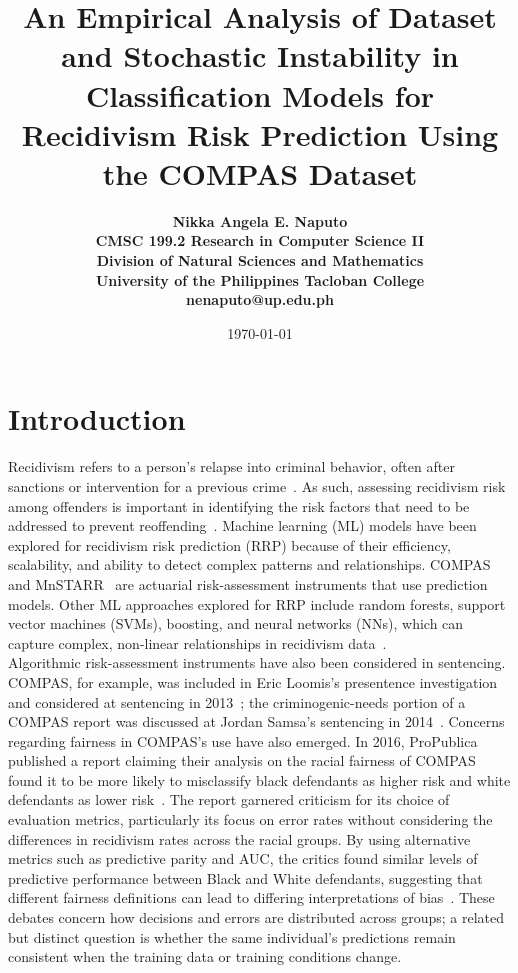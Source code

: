 \documentclass[12pt]{article}
\title{\bfseries An Empirical Analysis of Dataset and Stochastic Instability in Classification Models for Recidivism Risk Prediction Using the COMPAS Dataset}
\author{\bfseries 
 Nikka Angela E. Naputo\\
 CMSC 199.2 Research in Computer Science II\\
 Division of Natural Sciences and Mathematics\\
 University of the Philippines Tacloban College\\
 {\small nenaputo@up.edu.ph}
}
\date{\today}
\begin{document}
\sloppy %

\maketitle 
\newpage 

\tableofcontents 
\newpage

\section{Introduction} 
\tabto{2em} Recidivism refers to a person's relapse into criminal behavior, often after sanctions or intervention for a previous crime~\cite{nijrecidivism}. As such, assessing recidivism risk among offenders is important in identifying the risk factors that need to be addressed to prevent reoffending~\cite{bonta2007risk, duwe2017out}. Machine learning (ML) models have been explored for recidivism risk prediction (RRP) because of their efficiency, scalability, and ability to detect complex patterns and relationships. COMPAS~\cite{northpointe2015practitioner} and MnSTARR~\cite{duwe2014development} are actuarial risk-assessment instruments that use prediction models. Other ML approaches explored for RRP include random forests, support vector machines (SVMs), boosting, and neural networks (NNs), which can capture complex, non-linear relationships in recidivism data~\cite{duwe2017out}.\\

Algorithmic risk-assessment instruments have also been considered in sentencing. COMPAS, for example, was included in Eric Loomis’s presentence investigation and considered at sentencing in 2013~\cite{loomis2016}; the criminogenic-needs portion of a COMPAS report was discussed at Jordan Samsa’s sentencing in 2014~\cite{samsa2014}. Concerns regarding fairness in COMPAS’s use have also emerged. In 2016, ProPublica published a report claiming their analysis on the racial fairness of COMPAS found it to be more likely to misclassify black defendants as higher risk and white defendants as lower risk~\cite{propublica2016analysis}. The report garnered criticism for its choice of evaluation metrics, particularly its focus on error rates without considering the differences in recidivism rates across the racial groups. By using alternative metrics such as predictive parity and AUC, the critics found similar levels of predictive performance between Black and White defendants, suggesting that different fairness definitions can lead to differing interpretations of bias~\cite{dieterich2016compas, corbett2017algorithmic, flores2016false}. These debates concern how decisions and errors are distributed across groups; a related but distinct question is whether the same individual's predictions remain consistent when the training data or training conditions change. \\
\end{document}
